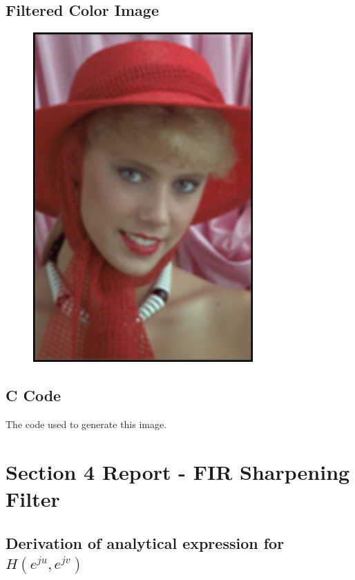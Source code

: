 \documentclass{article}
\begin{document}
\subsection{Filtered Color Image}
\begin{figure}[H]
    \centering
    \includegraphics[width=0.75\textwidth]{../results/smoothed.png}
    \begin{center}
    \end{center}
    \label{fig:A1}
\end{figure}
\subsection{C Code}
The code used to generate this image.


\section{Section 4 Report - FIR Sharpening Filter}
\subsection{Derivation of analytical expression for $H(e^{ju}, e^{jv})$}
\end{document}
